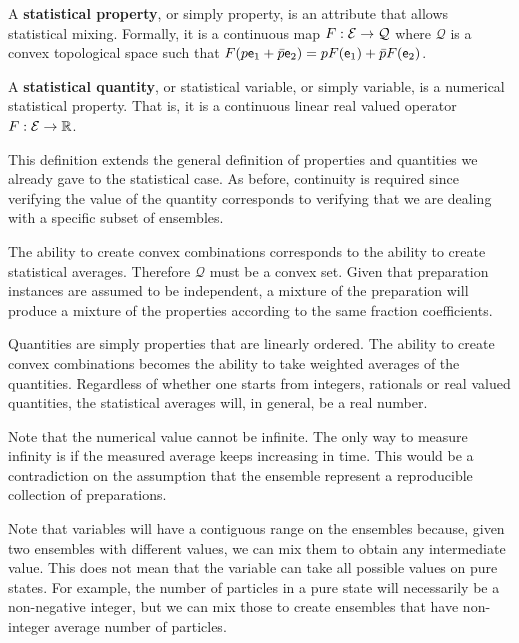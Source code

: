 \begin{defn}
	A \textbf{statistical property}, or simply property, is an attribute that allows statistical mixing. Formally, it is a continuous map $F : \mathcal{E} \to \mathcal{Q}$ where $\mathcal{Q}$ is a convex topological space such that $F(p \mathsf{e}_1 + \bar{p} \mathsf{e}_2) = p F(\mathsf{e}_1) + \bar{p} F(\mathsf{e}_2)$.
	
	A \textbf{statistical quantity}, or statistical variable, or simply variable, is a numerical statistical property. That is, it is a continuous linear real valued operator $F : \mathcal{E} \to \mathbb{R}$.
\end{defn}

\begin{justification}
	This definition extends the general definition of properties and quantities we already gave to the statistical case. As before, continuity is required since verifying the value of the quantity corresponds to verifying that we are dealing with a specific subset of ensembles.
	
	The ability to create convex combinations corresponds to the ability to create statistical averages. Therefore $\mathcal{Q}$ must be a convex set. Given that preparation instances are assumed to be independent, a mixture of the preparation will produce a mixture of the properties according to the same fraction coefficients.
	
	Quantities are simply properties that are linearly ordered. The ability to create convex combinations becomes the ability to take weighted averages of the quantities. Regardless of whether one starts from integers, rationals or real valued quantities, the statistical averages will, in general, be a real number.
	
	Note that the numerical value cannot be infinite. The only way to measure infinity is if the measured average keeps increasing in time. This would be a contradiction on the assumption that the ensemble represent a reproducible collection of preparations.
\end{justification}

\begin{remark}
	Note that variables will have a contiguous range on the ensembles because, given two ensembles with different values, we can mix them to obtain any intermediate value. This does not mean that the variable can take all possible values on pure states. For example, the number of particles in a pure state will necessarily be a non-negative integer, but we can mix those to create ensembles that have non-integer average number of particles.
\end{remark}

